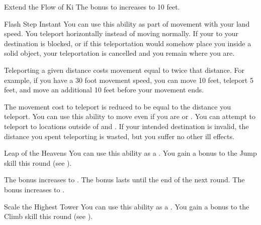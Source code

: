 {\begin{durationability}{Extend the Flow of Ki}
                \rankline
                 The bonus to  increases to 10 feet.
            \end{durationability}

            \begin{instantability}{Flash Step}
                Instant
                \rankline
                You can use this ability as part of movement with your land speed.
                You teleport horizontally instead of moving normally.
                If your  to your destination is blocked, or if this teleportation would somehow place you inside a solid object, your teleportation is cancelled and you remain where you are.

                Teleporting a given distance costs movement equal to twice that distance.
                For example, if you have a 30 foot movement speed, you can move 10 feet, teleport 5 feet, and move an additional 10 feet before your movement ends.

                \rankline
                 The movement cost to teleport is reduced to be equal to the distance you teleport.
                 You can use this ability to move even if you are \immobilized or \grappled.
                 You can attempt to teleport to locations outside of  and .
                If your intended destination is invalid, the distance you spent teleporting is wasted, but you suffer no other ill effects.
            \end{instantability}

            \begin{durationability}{Leap of the Heavens}
                \rankline
                You can use this ability as a .
                You gain a  bonus to the Jump skill this round (see ).

                \rankline
                 The bonus increases to .
                 The bonus lasts until the end of the next round.
                 The bonus increases to .
            \end{durationability}

            \begin{durationability}{Scale the Highest Tower}
                \rankline
                You can use this ability as a .
                You gain a  bonus to the Climb skill this round (see ).


\end{durationability}}
